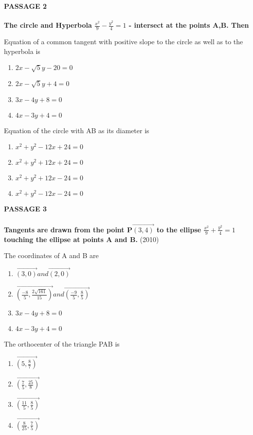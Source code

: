\textbf{PASSAGE 2 \\\\
The circle and Hyperbola $\frac{x^2}{9} - \frac{y^2}{4} = 1$  -
 intersect at the points A,B. Then} \\ 

 \item  Equation of a common tangent with positive slope to the
circle as well as to the hyperbola is

\begin{enumerate}[label=(\alph*)]
    \item $2x - \sqrt{5}y - 20 = 0 $
    \item $2x - \sqrt{5}y + 4  = 0$
    \item $3x - 4y + 8 = 0$
    \item $4x - 3y + 4 = 0$
\end{enumerate}

\item  Equation of the circle with AB as its diameter is
\begin{enumerate}[label=(\alph*)]
    \item $x^2 + y^2 - 12x + 24 = 0 $
    \item $x^2 + y^2 + 12x + 24 = 0$
    \item $x^2 + y^2 + 12x - 24 = 0$
    \item $x^2 + y^2 - 12x - 24 = 0$
\end{enumerate}


\textbf{PASSAGE 3 \\\\}
		\textbf{Tangents are drawn from the point P$\vec{(3, 4)}$ to the ellipse $\frac{x^2}{9} + \frac{y^2}{4} = 1$ touching the ellipse at points A and B.} \hfill {(2010)}

\item The coordinates of A and B are  

\begin{enumerate}[label=(\alph*)]
	\item $\vec{(3,0)} and \vec{(2,0)}$
	\item $\vec{(\frac{-8}{5},\frac{2\sqrt{161}}{15})} and \vec{(\frac{-9}{5},\frac{8}{5} )}$
    \item $3x - 4y + 8 = 0$
    \item $4x - 3y + 4 = 0$
\end{enumerate}

\item The orthocenter of the triangle PAB is

\begin{enumerate}[label=(\alph*)]
	\item $\vec{(5,\frac{8}{7})}$
	\item $\vec{(\frac{7}{5},\frac{25}{8})}$
	\item $\vec{(\frac{11}{5},\frac{8}{5})}$
	\item $\vec{(\frac{8}{25},\frac{7}{5})}$
\end{enumerate} 

